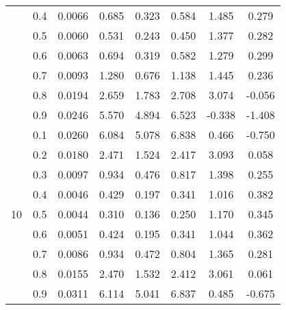 \documentclass[11pt,a4paper]{report}
\begin{document}
\begin{longtable}{ | c | c || c | c | c | c | c | c | }
 & 0.4 & 0.0066 & 0.685 & 0.323 & 0.584 & 1.485 & 0.279 \\
 & 0.5 & 0.0060 & 0.531 & 0.243 & 0.450 & 1.377 & 0.282 \\
 & 0.6 & 0.0063 & 0.694 & 0.319 & 0.582 & 1.279 & 0.299 \\
 & 0.7 & 0.0093 & 1.280 & 0.676 & 1.138 & 1.445 & 0.236 \\
 & 0.8 & 0.0194 & 2.659 & 1.783 & 2.708 & 3.074 & -0.056 \\
 & 0.9 & 0.0246 & 5.570 & 4.894 & 6.523 & -0.338 & -1.408 \\
 \hline
\multirow{9}{*}{10} & 0.1 & 0.0260 & 6.084 & 5.078 & 6.838 & 0.466 & -0.750 \\
 & 0.2 & 0.0180 & 2.471 & 1.524 & 2.417 & 3.093 & 0.058 \\
 & 0.3 & 0.0097 & 0.934 & 0.476 & 0.817 & 1.398 & 0.255 \\
 & 0.4 & 0.0046 & 0.429 & 0.197 & 0.341 & 1.016 & 0.382 \\
 & 0.5 & 0.0044 & 0.310 & 0.136 & 0.250 & 1.170 & 0.345 \\
 & 0.6 & 0.0051 & 0.424 & 0.195 & 0.341 & 1.044 & 0.362 \\
 & 0.7 & 0.0086 & 0.934 & 0.472 & 0.804 & 1.365 & 0.281 \\
 & 0.8 & 0.0155 & 2.470 & 1.532 & 2.412 & 3.061 & 0.061 \\
 & 0.9 & 0.0311 & 6.114 & 5.041 & 6.837 & 0.485 & -0.675 \\
 \hline
\hline
\end{longtable}
\end{document}
